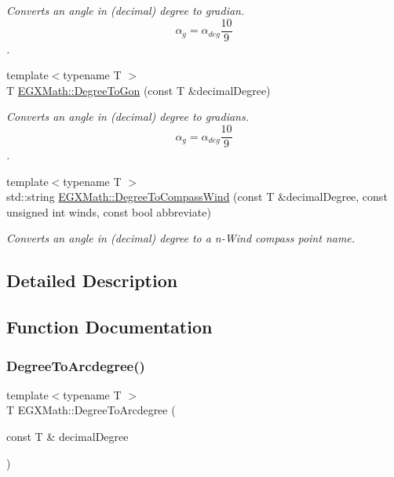 \begin{DoxyCompactItemize}
\begin{DoxyCompactList}\small\item\em Converts an angle in (decimal) degree to gradian. \[\alpha_{g}=\alpha_{deg}\frac{10}{9}\]. \end{DoxyCompactList}\item 
{\footnotesize template$<$typename T $>$ }\\T \mbox{\hyperlink{group___e_g_x_math-_conversions-_angle_conversions-_degree_ga87c3fab0867021e5d2501197b4db6194}{E\+G\+X\+Math\+::\+Degree\+To\+Gon}} (const T \&decimal\+Degree)
\begin{DoxyCompactList}\small\item\em Converts an angle in (decimal) degree to gradians. \[\alpha_{g}=\alpha_{deg}\frac{10}{9}\]. \end{DoxyCompactList}\item 
{\footnotesize template$<$typename T $>$ }\\std\+::string \mbox{\hyperlink{group___e_g_x_math-_conversions-_angle_conversions-_degree_ga5ffef873bcec300ab90570ad6e7b1ab1}{E\+G\+X\+Math\+::\+Degree\+To\+Compass\+Wind}} (const T \&decimal\+Degree, const unsigned int winds, const bool abbreviate)
\begin{DoxyCompactList}\small\item\em Converts an angle in (decimal) degree to a n-\/\+Wind compass point name. \end{DoxyCompactList}\end{DoxyCompactItemize}


\subsection{Detailed Description}


\subsection{Function Documentation}
\mbox{\label{group___e_g_x_math-_conversions-_angle_conversions-_degree_gac1b5f3b68f66c77a6df4ceef842c9b19}} 
\subsubsection{\texorpdfstring{Degree\+To\+Arcdegree()}{DegreeToArcdegree()}}
{\footnotesize\ttfamily template$<$typename T $>$ \\
T E\+G\+X\+Math\+::\+Degree\+To\+Arcdegree (\begin{DoxyParamCaption}\item[{const T \&}]{decimal\+Degree }\end{DoxyParamCaption})}



